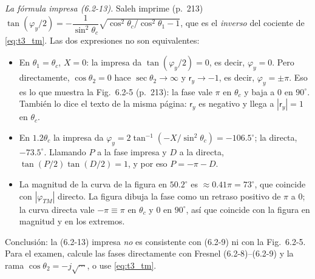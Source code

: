 \emph{La fórmula impresa (6.2-13).} Saleh imprime (p.~213)
$\tan(\varphi_y/2)=-\dfrac{1}{\sin^2\theta_c}\sqrt{\cos^2\theta_c/\cos^2\theta_1-1}$, que es el
\emph{inverso} del cociente de \eqref{eq:t3_tm}. Las dos expresiones no son equivalentes:
\begin{itemize}
\item En $\theta_1=\theta_c$, $X=0$: la impresa da $\tan(\varphi_y/2)=0$, es decir, $\varphi_y=0$. Pero
directamente, $\cos\theta_2=0$ hace $\sec\theta_2\to\infty$ y $\mathsf r_y\to-1$, es decir, $\varphi_y=\pm\pi$.
Eso es lo que muestra la Fig.~6.2-5 (p.~213): la fase vale $\pi$ en $\theta_c$ y baja a 0 en
$90^\circ$. También lo dice el texto de la misma página: $\mathsf r_y$ es negativo y llega a $|\mathsf r_y|=1$
en $\theta_c$.
\item En $1.2\theta_c$ la impresa da $\varphi_y=2\tan^{-1}(-X/\sin^2\theta_c)=-106.5^\circ$; la directa,
$-73.5^\circ$. Llamando $P$ a la fase impresa y $D$ a la directa, $\tan(P/2)\tan(D/2)=1$, y por eso $P=-\pi-D$.
\item La magnitud de la curva de la figura en $50.2^\circ$ es $\approx0.41\pi=73^\circ$, que coincide con
$|\varphi_{TM}|$ directo. La figura dibuja la fase como un retraso positivo de $\pi$ a 0; la curva
directa vale $-\pi\equiv\pi$ en $\theta_c$ y 0 en $90^\circ$, así que coincide con la figura en magnitud y en los extremos.
\end{itemize}
Conclusión: la (6.2-13) impresa \emph{no} es consistente con (6.2-9) ni con la Fig.~6.2-5. Para el
examen, calcule las fases directamente con Fresnel (6.2-8)--(6.2-9) y la rama
$\cos\theta_2=-j\sqrt{\cdots}$, o use \eqref{eq:t3_tm}.

